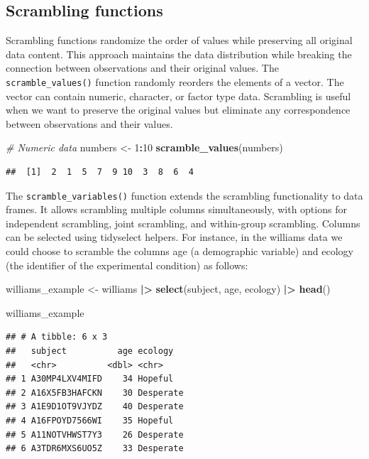 \documentclass[
  english,
  man,floatsintext]{apa6}
\newenvironment{Shaded}{\begin{snugshade}}{\end{snugshade}}
\newcommand{\CommentTok}[1]{\textcolor[rgb]{0.56,0.35,0.01}{\textit{#1}}}
\newcommand{\DecValTok}[1]{\textcolor[rgb]{0.00,0.00,0.81}{#1}}
\newcommand{\FunctionTok}[1]{\textcolor[rgb]{0.13,0.29,0.53}{\textbf{#1}}}
\newcommand{\NormalTok}[1]{#1}
\newcommand{\OtherTok}[1]{\textcolor[rgb]{0.56,0.35,0.01}{#1}}
\newcommand{\SpecialCharTok}[1]{\textcolor[rgb]{0.81,0.36,0.00}{\textbf{#1}}}
\begin{document}
\subsection{Scrambling functions}\label{scrambling-functions}

Scrambling functions randomize the order of values while preserving all original data content. This approach maintains the data distribution while breaking the connection between observations and their original values. The \texttt{scramble\_values()} function randomly reorders the elements of a vector. The vector can contain numeric, character, or factor type data. Scrambling is useful when we want to preserve the original values but eliminate any correspondence between observations and their values.

\begin{Shaded}
\begin{Highlighting}[]
\CommentTok{\# Numeric data}
\NormalTok{numbers }\OtherTok{\textless{}{-}} \DecValTok{1}\SpecialCharTok{:}\DecValTok{10}
\FunctionTok{scramble\_values}\NormalTok{(numbers)}
\end{Highlighting}
\end{Shaded}

\begin{verbatim}
##  [1]  2  1  5  7  9 10  3  8  6  4
\end{verbatim}

The \texttt{scramble\_variables()} function extends the scrambling functionality to data frames. It allows scrambling multiple columns simultaneously, with options for independent scrambling, joint scrambling, and within-group scrambling. Columns can be selected using tidyselect helpers. For instance, in the williams data we could choose to scramble the columns age (a demographic variable) and ecology (the identifier of the experimental condition) as follows:

\begin{Shaded}
\begin{Highlighting}[]
\NormalTok{williams\_example }\OtherTok{\textless{}{-}}
\NormalTok{    williams }\SpecialCharTok{|\textgreater{}}
    \FunctionTok{select}\NormalTok{(subject, age, ecology) }\SpecialCharTok{|\textgreater{}} 
    \FunctionTok{head}\NormalTok{()}

\NormalTok{williams\_example}
\end{Highlighting}
\end{Shaded}

\begin{verbatim}
## # A tibble: 6 x 3
##   subject          age ecology  
##   <chr>          <dbl> <chr>    
## 1 A30MP4LXV4MIFD    34 Hopeful  
## 2 A16X5FB3HAFCKN    30 Desperate
## 3 A1E9D1OT9VJYDZ    40 Desperate
## 4 A16FPOYD7566WI    35 Hopeful  
## 5 A11NOTVHWST7Y3    26 Desperate
## 6 A3TDR6MXS6UO5Z    33 Desperate
\end{verbatim}
\end{document}
